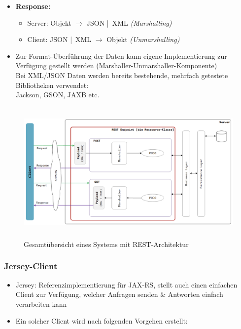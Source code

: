 \documentclass[a4paper]{article}
\begin{document}
\begin{itemize}
					\item \textbf{Response:}
						\begin{itemize}
							\item Server: Objekt \qquad $\rightarrow$ JSON | XML \textit{(Marshalling)}
							\item Client: JSON | XML $\rightarrow$ Objekt \textit{(Unmarshalling)}
						\end{itemize}
					
					\item Zur Format-Überführung der Daten kann eigene Implementierung zur Verfügung gestellt werden (Marshaller-Unmarshaller-Komponente)\\
					Bei XML/JSON Daten werden bereits bestehende, mehrfach getestete Bibliotheken verwendet:\\
					Jackson, GSON, JAXB etc.
				\end{itemize}
			
				\begin{figure}[!htb]
					\centering
					\includegraphics[keepaspectratio, height=7cm]{img/ws/overview.png}
					\caption{Gesamtübersicht eines Systems mit REST-Architektur}
					\label{fig:rest_overview}
				\end{figure}
		
		\newpage
		
			\subsubsection{Jersey-Client}
			
			\begin{itemize}
				\item Jersey: Referenzimplementierung für JAX-RS, stellt auch einen einfachen Client zur Verfügung, welcher Anfragen senden \& Antworten einfach verarbeiten kann
				\item Ein solcher Client wird nach folgenden Vorgehen erstellt:\\
			\end{itemize}
		
\end{document}
